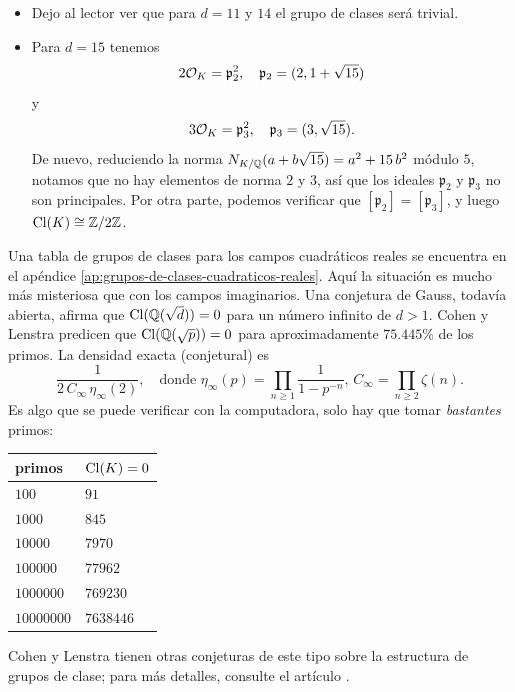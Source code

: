 \begin{ejemplo}
\begin{itemize}
  \item Dejo al lector ver que para $d = 11$ y $14$ el grupo de clases será
    trivial.

  \item Para $d = 15$ tenemos
    $$2\mathcal{O}_K = \mathfrak{p}_2^2, \quad \mathfrak{p}_2 = (2, 1 + \sqrt{15})$$
    y
    $$3\mathcal{O}_K = \mathfrak{p}_3^2, \quad \mathfrak{p}_3 = (3, \sqrt{15}).$$
    De nuevo, reduciendo la norma
    $N_{K/\mathbb{Q}} (a + b\sqrt{15}) = a^2 + 15\,b^2$ módulo $5$, notamos que
    no hay elementos de norma $2$ y $3$, así que los ideales $\mathfrak{p}_2$ y
    $\mathfrak{p}_3$ no son principales. Por otra parte, podemos verificar que
    $[\mathfrak{p}_2] = [\mathfrak{p}_3]$, y luego
    $\operatorname{Cl} (K) \cong \mathbb{Z}/2\mathbb{Z}$. \qedhere
  \end{itemize}
\end{ejemplo}

Una tabla de grupos de clases para los campos cuadráticos reales se encuentra
en el apéndice \ref{ap:grupos-de-clases-cuadraticos-reales}. Aquí la situación
es mucho más misteriosa que con los campos imaginarios. Una conjetura de Gauss,
todavía abierta, afirma que $\operatorname{Cl} (\mathbb{Q} (\sqrt{d})) = 0$ para un número infinito
de $d > 1$. Cohen y Lenstra predicen que $\operatorname{Cl} (\mathbb{Q} (\sqrt{p})) = 0$ para
aproximadamente $75.445\%$ de los primos.  La densidad exacta (conjetural) es
\[ \frac{1}{2\,C_\infty\,\eta_\infty (2)}, \quad \text{donde }
   \eta_\infty (p) = \prod_{n \ge 1} \frac{1}{1 - p^{-n}}, \,
    C_\infty = \prod_{n \ge 2} \zeta (n). \]
Es algo que se puede verificar con la computadora, solo hay que tomar
\emph{bastantes} primos:
\begin{center}\renewcommand{\arraystretch}{1.5}
  \begin{tabular}{ll}
    primos & $\operatorname{Cl} (K) = 0$ \\
    \hline
    $100$      & $91$ \\
    $1000$     & $845$ \\
    $10000$    & $7970$ \\
    $100000$   & $77962$ \\
    $1000000$  & $769230$ \\
    $10000000$ & $7638446$
  \end{tabular}
\end{center}
Cohen y Lenstra tienen otras conjeturas de este tipo sobre la estructura de
grupos de clase; para más detalles, consulte el artículo
\cite{Cohen-Lenstra-1984}.

\vspace{1em}

